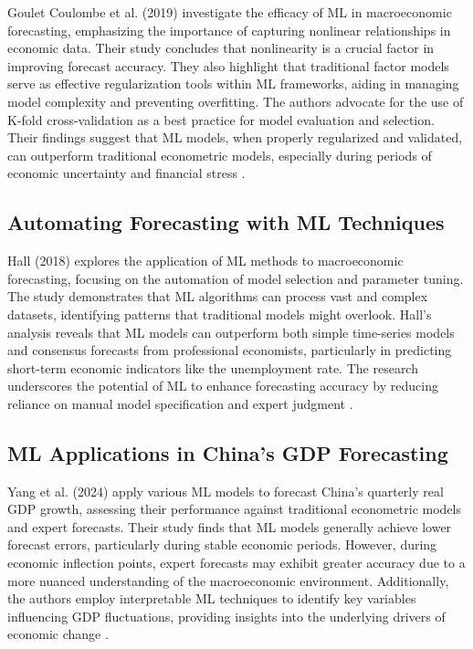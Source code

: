 \documentclass[12pt]{article}
\begin{document}
Goulet Coulombe et al. (2019) investigate the efficacy of ML in macroeconomic forecasting, emphasizing the importance of capturing nonlinear relationships in economic data. Their study concludes that nonlinearity is a crucial factor in improving forecast accuracy. They also highlight that traditional factor models serve as effective regularization tools within ML frameworks, aiding in managing model complexity and preventing overfitting. The authors advocate for the use of K-fold cross-validation as a best practice for model evaluation and selection. Their findings suggest that ML models, when properly regularized and validated, can outperform traditional econometric models, especially during periods of economic uncertainty and financial stress \cite{GouletCoulombe2019}.

\subsection{Automating Forecasting with ML Techniques}

Hall (2018) explores the application of ML methods to macroeconomic forecasting, focusing on the automation of model selection and parameter tuning. The study demonstrates that ML algorithms can process vast and complex datasets, identifying patterns that traditional models might overlook. Hall's analysis reveals that ML models can outperform both simple time-series models and consensus forecasts from professional economists, particularly in predicting short-term economic indicators like the unemployment rate. The research underscores the potential of ML to enhance forecasting accuracy by reducing reliance on manual model specification and expert judgment \cite{Hall2018}.

\subsection{ML Applications in China's GDP Forecasting}

Yang et al. (2024) apply various ML models to forecast China's quarterly real GDP growth, assessing their performance against traditional econometric models and expert forecasts. Their study finds that ML models generally achieve lower forecast errors, particularly during stable economic periods. However, during economic inflection points, expert forecasts may exhibit greater accuracy due to a more nuanced understanding of the macroeconomic environment. Additionally, the authors employ interpretable ML techniques to identify key variables influencing GDP fluctuations, providing insights into the underlying drivers of economic change \cite{Yang2024}.
\end{document}
